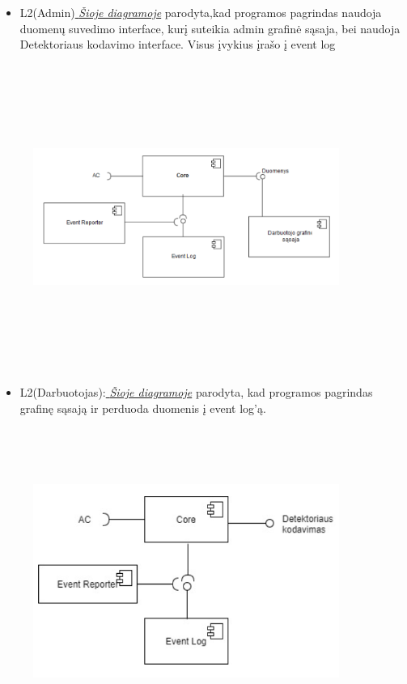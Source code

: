 \documentclass[oneside]{VUMIFPSkursinis}
\begin{document}
	
	\begin{itemize}
		\item L2(Admin)\hyperref[fig:l2admin]{\textit{  Šioje diagramoje}}  parodyta,kad programos pagrindas naudoja duomenų suvedimo interface, kurį suteikia admin grafinė sąsaja, bei naudoja Detektoriaus kodavimo interface. Visus įvykius įrašo į event log

	\end{itemize}
	\begin{figure}[H]
	\centering	
\includegraphics[width=10cm,height=10cm,keepaspectratio]{l2darb.png}
\caption{}
\label{fig:l2darb}
\end{figure}
		

\begin{itemize}
		\item L2(Darbuotojas):\hyperref[fig:l2darb]{\textit{  Šioje diagramoje}}  parodyta, kad programos pagrindas  grafinę sąsają ir perduoda duomenis į event log’ą. 
\end{itemize}
\begin{figure}[H]
\centering	
	\includegraphics[width=10cm,height=10cm,keepaspectratio]{l2det.png}
	\caption{}
	\label{fig:l2det}
\end{figure}
		
\end{document}
